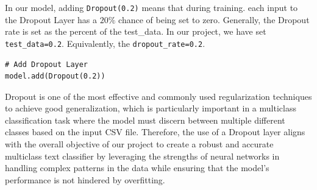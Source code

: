 In our model, adding \verb*|Dropout(0.2)| means that during training. each input to the Dropout Layer has a $20\%$ chance of being set to zero. Generally, the Dropout rate is set as the percent of the test\_data. In our project, we have set \verb*|test_data=0.2|. Equivalently, the \verb*|dropout_rate=0.2|.\\

\begin{lstlisting}
# Add Dropout Layer
model.add(Dropout(0.2))	
\end{lstlisting}

Dropout is one of the most effective and commonly used regularization techniques to achieve good generalization, which is particularly important in a multiclass classification task where the model must discern between multiple different classes based on the input CSV file.
Therefore, the use of a Dropout layer aligns with the overall objective of our project to create a robust and accurate multiclass text classifier by leveraging the strengths of neural networks in handling complex patterns in the data while ensuring that the model's performance is not hindered by overfitting.